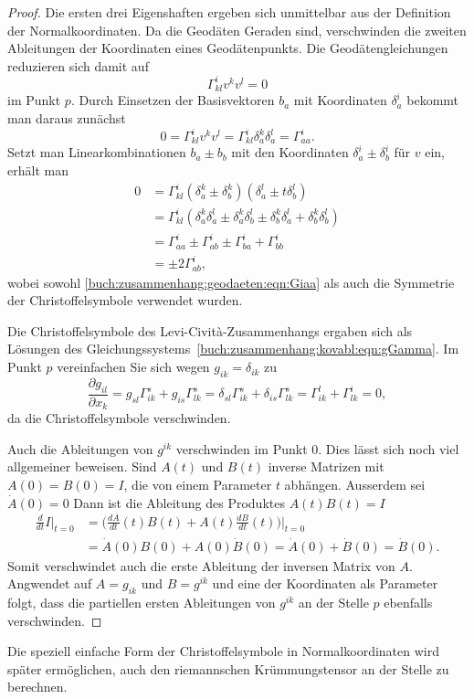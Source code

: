 \begin{proof}
Die ersten drei Eigenshaften ergeben sich unmittelbar aus der Definition
der Normalkoordinaten.
Da die Geodäten Geraden sind, verschwinden die zweiten Ableitungen
der Koordinaten eines Geodätenpunkts.
Die Geodätengleichungen reduzieren sich damit auf
\[
\Gamma^i_{kl} v^kv^l = 0
\]
im Punkt $p$.
Durch Einsetzen der Basisvektoren $b_a$ mit Koordinaten $\delta_a^i$
bekommt man daraus zunächst
\begin{equation}
0
=
\Gamma^i_{kl}v^kv^l
=
\Gamma^i_{kl}\delta_a^k\delta_a^l
=
\Gamma^i_{aa}.
\label{buch:zusammenhang:geodaeten:eqn:Giaa}
\end{equation}
Setzt man Linearkombinationen $b_a\pm b_b$ mit den Koordinaten
$\delta_a^i\pm \delta_b^i$ für $v$ ein, erhält man
\begin{align*}
0
&=
\Gamma^i_{kl} (\delta_a^k \pm \delta_b^k)(\delta_a^l \pm t\delta_b^l)
\\
&=
\Gamma^i_{kl}(\delta_a^k\delta_a^l
\pm \delta_a^k\delta_b^l
\pm \delta_b^k\delta_a^l
+ \delta_b^k\delta_b^l)
\\
&=
\Gamma^i_{aa}
\pm
\Gamma^i_{ab}
\pm
\Gamma^i_{ba}
+
\Gamma^i_{bb}
\\
&=
\pm
2
\Gamma^i_{ab},
\end{align*}
wobei sowohl
\eqref{buch:zusammenhang:geodaeten:eqn:Giaa}
als auch die Symmetrie der Christoffelsymbole verwendet wurden.

Die Christoffelsymbole des Levi-Cività-Zusammenhangs ergaben sich
als Lösungen des Gleichungssystems~\ref{buch:zusammenhang:kovabl:eqn:gGamma}.
Im Punkt $p$ vereinfachen Sie sich wegen $g_{ik}=\delta_{ik}$ zu
\[
\frac{\partial g_{il}}{\partial x_k}
=
g_{sl}\Gamma^s_{ik}
+
g_{is}\Gamma^s_{lk}
=
\delta_{sl}\Gamma^s_{ik}
+
\delta_{is}\Gamma^s_{lk}
=
\Gamma^l_{ik}
+
\Gamma^i_{lk}
=
0,
\]
da die Christoffelsymbole verschwinden.

Auch die Ableitungen von $g^{ik}$ verschwinden im Punkt $0$.
Dies lässt sich noch viel allgemeiner beweisen.
Sind $A(t)$ und $B(t)$ inverse Matrizen mit $A(0)=B(0)=I$, die von einem
Parameter $t$ abhängen.
Ausserdem sei $\dot{A}(0)=0$
Dann ist die Ableitung des Produktes $A(t)B(t)=I$
\begin{align*}
\frac{d}{dt}I\bigg|_{t=0}
&=
\biggl(
\frac{dA}{dt}(t) B(t)
+
A(t)
\frac{dB}{dt}(t)
\biggr)\bigg|_{t=0}
\\
&=
\dot{A}(0)
B(0)
+
A(0)
\dot{B}(0)
=
\dot{A}(0)
+
\dot{B}(0)
=
\dot{B}(0).
\end{align*}
Somit verschwindet auch die erste Ableitung der inversen Matrix von $A$.
Angwendet auf $A=g_{ik}$ und $B=g^{ik}$ und eine der Koordinaten als
Parameter folgt, dass die partiellen ersten Ableitungen von $g^{ik}$
an der Stelle $p$ ebenfalls verschwinden.
\end{proof}

Die speziell einfache Form der Christoffelsymbole in Normalkoordinaten
wird später ermöglichen, auch den riemannschen Krümmungstensor an der
Stelle zu berechnen.



